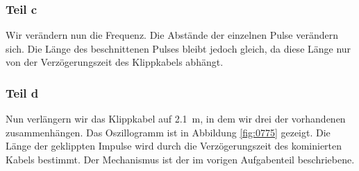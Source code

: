 \FloatBarrier
\subsubsection{Teil c}

Wir verändern nun die Frequenz. Die Abstände der einzelnen Pulse verändern
sich. Die Länge des beschnittenen Pulses bleibt jedoch gleich, da diese Länge
nur von der Verzögerungszeit des Klippkabels abhängt.

\FloatBarrier
\subsubsection{Teil d}

Nun verlängern wir das Klippkabel auf \SI{2.1}{\meter}, in dem wir drei der
vorhandenen zusammenhängen. Das Oszillogramm ist in Abbildung \ref{fig:0775}
gezeigt. Die Länge der geklippten Impulse wird durch die Verzögerungszeit des
kominierten Kabels bestimmt. Der Mechanismus ist der im vorigen Aufgabenteil
beschriebene.

